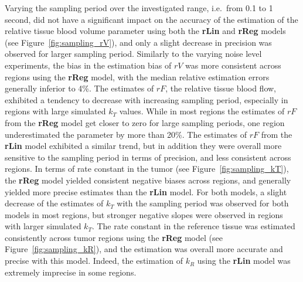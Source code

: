 Varying the sampling period over the investigated range, i.e.~from 0.1 to 1 second, did not have a significant impact on the accuracy of the estimation of the relative tissue blood volume parameter using both the \textbf{rLin} and \textbf{rReg} models (see Figure~\ref{fig:sampling_rV}), and only a slight decrease in precision was observed for larger sampling period.
Similarly to the varying noise level experiments, the bias in the estimation bias of $rV$ was more consistent across regions using the \textbf{rReg} model, with the median relative estimation errors generally inferior to 4\%.
The estimates of $rF$, the relative tissue blood flow, exhibited a tendency to decrease with increasing sampling period, especially in regions with large simulated $k_T$ values. 
While in most regions the estimates of $rF$ from the \textbf{rReg} model get closer to zero for large sampling periods, one region underestimated the parameter by more than 20\%.
The estimates of $rF$ from the \textbf{rLin} model exhibited a similar trend, but in addition they were overall more sensitive to the sampling period in terms of precision, and less consistent across regions.
In terms of rate constant in the tumor (see Figure~\ref{fig:sampling_kT}), the \textbf{rReg} model yielded consistent negative biases across regions, and generally yielded more precise estimates than the \textbf{rLin} model.
For both models, a slight decrease of the estimates of $k_T$ with the sampling period was observed for both models in most regions, but stronger negative slopes were observed in regions with larger simulated $k_T$.
The rate constant in the reference tissue was estimated consistently across tumor regions using the \textbf{rReg} model (see Figure~\ref{fig:sampling_kR}), and the estimation was overall more accurate and precise with this model.
Indeed, the estimation of $k_R$ using the \textbf{rLin} model was extremely imprecise in some regions.

